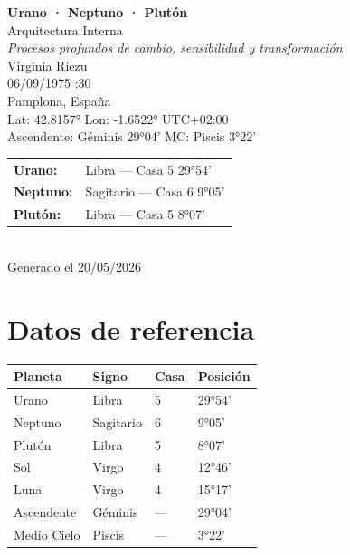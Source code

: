 \documentclass[11pt,a4paper]{article}
\begin{document}
\begin{titlepage}
  \centering
  \vspace*{1.5cm}
  {\Huge\bfseries\color{azulai} Urano · Neptuno · Plutón}\\[0.5cm]
  {\large\color{grisai} Arquitectura Interna}\\[0.3cm]
  {\small\itshape\color{grisai} Procesos profundos de cambio, sensibilidad y transformación}\\[2cm]
  {\huge\color{doradoai} Virginia Riezu}\\[1.5cm]
  {\Large 06/09/1975 :30}\\[0.3cm]
  {\Large Pamplona, España}\\[0.3cm]
  {\normalsize Lat: 42.8157° \quad Lon: -1.6522° \quad UTC+02:00}\\[0.3cm]
  {\normalsize Ascendente: Géminis 29°04' \quad
    MC: Piscis 3°22'}\\[2cm]
  \begin{tabular}{ll}
    \textbf{Urano:}   & Libra — Casa 5 29°54'  \\
    \textbf{Neptuno:} & Sagitario — Casa 6 9°05' \\
    \textbf{Plutón:}  & Libra — Casa 5 8°07' \\
  \end{tabular}\\[2cm]
  \vfill
  {\small Generado el 20/05/2026}
\end{titlepage}

\tableofcontents
\newpage

\section{Datos de referencia}

\begin{center}
\begin{tabular}{llll}
  \toprule
  \textbf{Planeta} & \textbf{Signo} & \textbf{Casa} & \textbf{Posición} \\
  \midrule
  Urano    & Libra   & 5   & 29°54'  \\
  Neptuno & Sagitario  & 6  & 9°05' \\
  Plutón  & Libra  & 5  & 8°07' \\
  Sol              & Virgo  & 4  & 12°46' \\
  Luna             & Virgo & 4 & 15°17' \\
  Ascendente       & Géminis          & ---                   & 29°04' \\
  Medio Cielo      & Piscis           & ---                   & 3°22' \\
  \bottomrule
\end{tabular}
\end{center}
\end{document}
